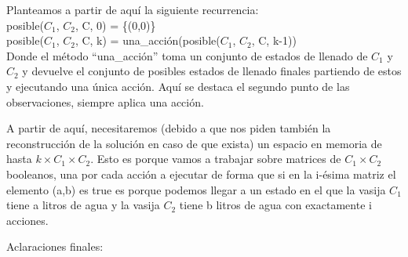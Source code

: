 \documentclass[12pt]{article}
\begin{document}
Planteamos a partir de aquí la siguiente recurrencia: \\ 
    
    posible($C_1$, $C_2$, C, 0) = \{(0,0)\}\\
    posible($C_1$, $C_2$, C, k) = una\_acción(posible($C_1$, $C_2$, C, k-1))\\
    
Donde el método ``una\_acción'' toma un conjunto de estados de llenado de $C_1$ y $C_2$ y
devuelve el conjunto de posibles estados de llenado finales partiendo de estos y ejecutando
una única acción. Aquí se destaca el segundo punto de las observaciones, siempre aplica 
una acción. 
\setlength{\parskip}{\baselineskip}

A partir de aquí, necesitaremos (debido a que nos piden también la reconstrucción de la 
solución en caso de que exista) un espacio en memoria de hasta $k \times C_1 \times C_2$.
Esto es porque vamos a trabajar sobre matrices de $C_1 \times C_2$ booleanos, una por 
cada acción a ejecutar de forma que si en la i-ésima matriz el elemento (a,b) es true es
porque podemos llegar a un estado en el que la vasija $C_1$ tiene a litros de agua y la
vasija $C_2$ tiene b litros de agua con exactamente i acciones.


Aclaraciones finales:
\setlength{\parskip}{0mm}
\end{document}
